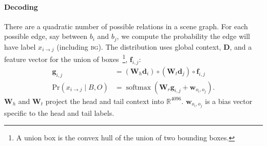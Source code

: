 \documentclass[10pt,twocolumn,letterpaper]{article}
\DeclareMathOperator*{\softmax}{softmax}
\newcommand{\authcomment}[3]{\textcolor{#1}{#2:[#3]}}
\newcommand{\sam}[1]{\authcomment{blue}{sam}{#1}}
\newcommand{\p}[1]{\textrm{Pr}( #1 )}  %
\newcommand{\R}{\mathbb{R}}   %
\newcommand{\bg}{\textsc{bg}}  %
\newcommand{\vect}[1]{\mathbf{#1}}   %
\newcommand{\mat}[1]{\mathbf{#1}}    %
\begin{document}
\paragraph{Decoding}
There are a quadratic number of possible relations in a scene graph.
For each possible edge, say between $b_i$ and $b_j$, we compute the probability the edge will have label $x_{i \to j}$ (including \bg).
The distribution uses global context, $\mat{D}$, and a feature vector for the union of boxes~\footnote{A union box is the convex hull of the union of two bounding boxes.}, $\vect{f}_{i,j}$:
\begin{align}
\label{eq:hadamard}
      \vect{g}_{i, j} &= (\mat{W}_h \vect{d}_{i}) \circ (\mat{W}_t \vect{d}_{j}) \circ \vect{f}_{i, j} \\
      \p{ x_{i \to j} \mid B, O } &=
 \softmax{\left(
   \mat{W}_r \vect{g}_{i, j} + \vect{w}_{o_i,o_j}
 \right)}.
\end{align}$\mat{W}_h$ and $\mat{W}_t$ project the head and tail context into $\R^{4096}$.
$\vect{w}_{o_i,o_j}$ is a bias vector specific to the head and tail labels.
\end{document}
